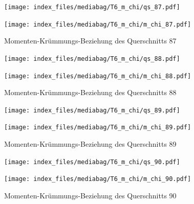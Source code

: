 \documentclass[
  11pt,
  letterpaper,
]{scrreprt}
\begin{document}
\begin{figure}[H]

\begin{minipage}{0.50\linewidth}
\texttt{[image: index\_files/mediabag/T6\_m\_chi/qs\_87.pdf]}\end{minipage}%
%
\begin{minipage}{0.50\linewidth}
\texttt{[image: index\_files/mediabag/T6\_m\_chi/m\_chi\_87.pdf]}\end{minipage}%

\caption{\label{fig-m_chi_appendix}Momenten-Krümmungs-Beziehung des
Querschnitts 87}

\end{figure}%

\begin{figure}[H]

\begin{minipage}{0.50\linewidth}
\texttt{[image: index\_files/mediabag/T6\_m\_chi/qs\_88.pdf]}\end{minipage}%
%
\begin{minipage}{0.50\linewidth}
\texttt{[image: index\_files/mediabag/T6\_m\_chi/m\_chi\_88.pdf]}\end{minipage}%

\caption{\label{fig-m_chi_appendix}Momenten-Krümmungs-Beziehung des
Querschnitts 88}

\end{figure}%

\begin{figure}[H]

\begin{minipage}{0.50\linewidth}
\texttt{[image: index\_files/mediabag/T6\_m\_chi/qs\_89.pdf]}\end{minipage}%
%
\begin{minipage}{0.50\linewidth}
\texttt{[image: index\_files/mediabag/T6\_m\_chi/m\_chi\_89.pdf]}\end{minipage}%

\caption{\label{fig-m_chi_appendix}Momenten-Krümmungs-Beziehung des
Querschnitts 89}

\end{figure}%

\begin{figure}[H]

\begin{minipage}{0.50\linewidth}
\texttt{[image: index\_files/mediabag/T6\_m\_chi/qs\_90.pdf]}\end{minipage}%
%
\begin{minipage}{0.50\linewidth}
\texttt{[image: index\_files/mediabag/T6\_m\_chi/m\_chi\_90.pdf]}\end{minipage}%

\caption{\label{fig-m_chi_appendix}Momenten-Krümmungs-Beziehung des
Querschnitts 90}

\end{figure}%
\end{document}
